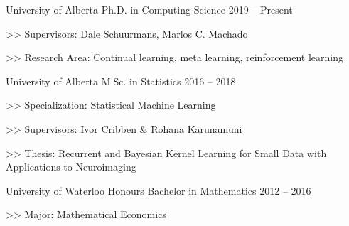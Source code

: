 \begin{cventries}
  \cventry
    {University of Alberta}
    {Ph.D. in Computing Science}
    {2019 -- Present}
    {
      \begin{cvitems}
        \item[>>] {Supervisors: Dale Schuurmans, Marlos C. Machado}
        \item[>>] {Research Area: Continual learning, meta learning, reinforcement learning}
      \end{cvitems}
    }

  \cventry
    {University of Alberta}
    {M.Sc. in Statistics}
    {2016 -- 2018}
    {
      \begin{cvitems}
        \item[>>] {Specialization: Statistical Machine Learning}
        \item[>>] {Supervisors: Ivor Cribben \& Rohana Karunamuni}
        \item[>>] {Thesis: Recurrent and Bayesian Kernel Learning for Small Data with Applications to Neuroimaging}
      \end{cvitems}
    }
  \cventry
    {University of Waterloo}
    {Honours Bachelor in Mathematics}
    {2012 -- 2016}
    {
      \begin{cvitems}
        \item[>>] Major: Mathematical Economics
      \end{cvitems}
    }
\end{cventries}

